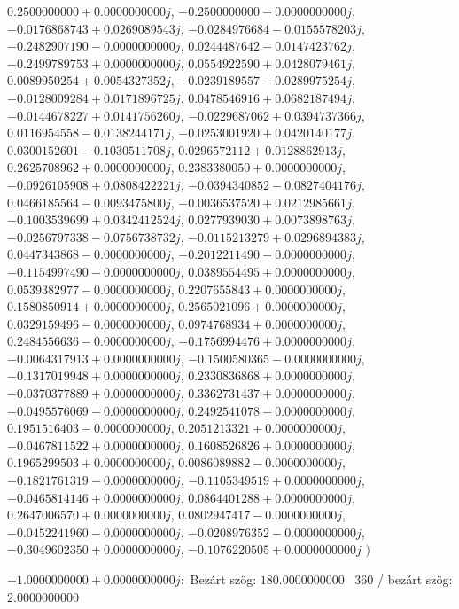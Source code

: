 \documentclass[14pt,a4paper]{article}
\begin{document}
\begin{itemize}
$0.2500000000+0.0000000000j$, $-0.2500000000-0.0000000000j$, $-0.0176868743+0.0269089543j$, $-0.0284976684-0.0155578203j$, $-0.2482907190-0.0000000000j$, $0.0244487642-0.0147423762j$, $-0.2499789753+0.0000000000j$, $0.0554922590+0.0428079461j$, $0.0089950254+0.0054327352j$, $-0.0239189557-0.0289975254j$, $-0.0128009284+0.0171896725j$, $0.0478546916+0.0682187494j$, $-0.0144678227+0.0141756260j$, $-0.0229687062+0.0394737366j$, $0.0116954558-0.0138244171j$, $-0.0253001920+0.0420140177j$, $0.0300152601-0.1030511708j$, $0.0296572112+0.0128862913j$, $0.2625708962+0.0000000000j$, $0.2383380050+0.0000000000j$, $-0.0926105908+0.0808422221j$, $-0.0394340852-0.0827404176j$, $0.0466185564-0.0093475800j$, $-0.0036537520+0.0212985661j$, $-0.1003539699+0.0342412524j$, $0.0277939030+0.0073898763j$, $-0.0256797338-0.0756738732j$, $-0.0115213279+0.0296894383j$, $0.0447343868-0.0000000000j$, $-0.2012211490-0.0000000000j$, $-0.1154997490-0.0000000000j$, $0.0389554495+0.0000000000j$, $0.0539382977-0.0000000000j$, $0.2207655843+0.0000000000j$, $0.1580850914+0.0000000000j$, $0.2565021096+0.0000000000j$, $0.0329159496-0.0000000000j$, $0.0974768934+0.0000000000j$, $0.2484556636-0.0000000000j$, $-0.1756994476+0.0000000000j$, $-0.0064317913+0.0000000000j$, $-0.1500580365-0.0000000000j$, $-0.1317019948+0.0000000000j$, $0.2330836868+0.0000000000j$, $-0.0370377889+0.0000000000j$, $0.3362731437+0.0000000000j$, $-0.0495576069-0.0000000000j$, $0.2492541078-0.0000000000j$, $0.1951516403-0.0000000000j$, $0.2051213321+0.0000000000j$, $-0.0467811522+0.0000000000j$, $0.1608526826+0.0000000000j$, $0.1965299503+0.0000000000j$, $0.0086089882-0.0000000000j$, $-0.1821761319-0.0000000000j$, $-0.1105349519+0.0000000000j$, $-0.0465814146+0.0000000000j$, $0.0864401288+0.0000000000j$, $0.2647006570+0.0000000000j$, $0.0802947417-0.0000000000j$, $-0.0452241960-0.0000000000j$, $-0.0208976352-0.0000000000j$, $-0.3049602350+0.0000000000j$, $-0.1076220505+0.0000000000j$
$\big)$
\end{itemize}
$-1.0000000000+0.0000000000j$:\
Bezárt szög: $180.0000000000$ \
360 / bezárt szög: $2.0000000000$\
\end{document}
